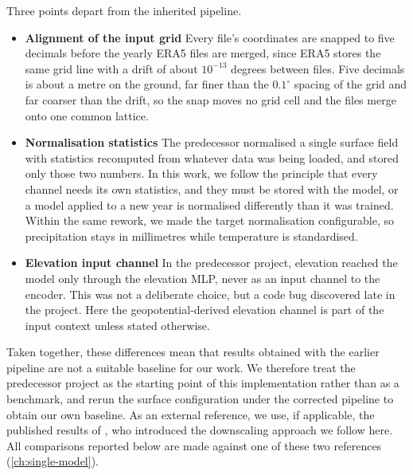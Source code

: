 Three points depart from the inherited pipeline.
\begin{itemize}
    \item \textbf{Alignment of the input grid} Every file's coordinates are snapped to five decimals before the yearly ERA5 files are merged, since ERA5 stores the same grid line with a drift of about $10^{-13}$ degrees between files. Five decimals is about a metre on the ground, far finer than the $0.1^{\circ}$ spacing of the grid and far coarser than the drift, so the snap moves no grid cell and the files merge onto one common lattice.
    \item \textbf{Normalisation statistics} The predecessor normalised a single surface field with statistics recomputed from whatever data was being loaded, and stored only those two numbers. In this work, we follow the principle that every channel needs its own statistics, and they must be stored with the model, or a model applied to a new year is normalised differently than it was trained. Within the same rework, we made the target normalisation configurable, so precipitation stays in millimetres while temperature is standardised.
    \item \textbf{Elevation input channel} In the predecessor project, elevation reached the model only through the elevation MLP, never as an input channel to the encoder. This was not a deliberate choice, but a code bug discovered late in the project. Here the geopotential-derived elevation channel is part of the input context unless stated otherwise.
\end{itemize}

Taken together, these differences mean that results obtained with the earlier pipeline are not a suitable baseline for our work. We therefore treat the predecessor project as the starting point of this implementation rather than as a benchmark, and rerun the surface configuration under the corrected pipeline to obtain our own baseline. As an external reference, we use, if applicable, the published results of \textcite{vaughan2022convcnp}, who introduced the downscaling approach we follow here. All comparisons reported below are made against one of these two references (\cref{ch:single-model}).

